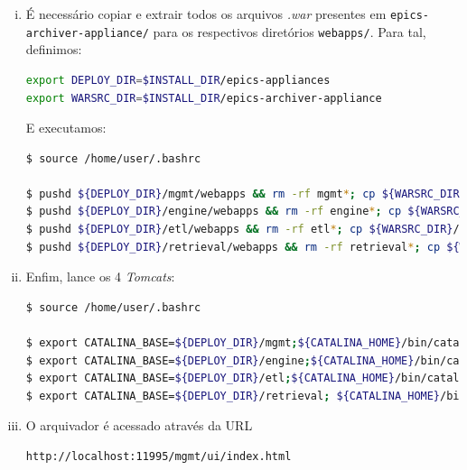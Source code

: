 \begin {enumerate}[i.]
\item É necessário copiar e extrair todos os arquivos \textit{.war} presentes em
\texttt{epics-archiver-appliance/} para os respectivos diretórios
\texttt{webapps/}. Para tal, definimos:

\begin{lstlisting}[language=bash, style=nonumbers]
export DEPLOY_DIR=$INSTALL_DIR/epics-appliances
export WARSRC_DIR=$INSTALL_DIR/epics-archiver-appliance
\end{lstlisting}

E executamos:

\begin{lstlisting}[language=bash, style=nonumbers]
$ source /home/user/.bashrc

$ pushd ${DEPLOY_DIR}/mgmt/webapps && rm -rf mgmt*; cp ${WARSRC_DIR}/mgmt.war .; mkdir mgmt; cd mgmt; jar xf ../mgmt.war; popd; 
$ pushd ${DEPLOY_DIR}/engine/webapps && rm -rf engine*; cp ${WARSRC_DIR}/engine.war .; mkdir engine; cd engine; jar xf ../engine.war; popd; 
$ pushd ${DEPLOY_DIR}/etl/webapps && rm -rf etl*; cp ${WARSRC_DIR}/etl.war .; mkdir etl; cd etl; jar xf ../etl.war; popd; 
$ pushd ${DEPLOY_DIR}/retrieval/webapps && rm -rf retrieval*; cp ${WARSRC_DIR}/retrieval.war .; mkdir retrieval; cd retrieval; jar xf ../retrieval.war; popd;

\end{lstlisting}

\item Enfim, lance os 4 \textit{Tomcats}:

\begin{lstlisting}[language=bash, style=nonumbers]
$ source /home/user/.bashrc

$ export CATALINA_BASE=${DEPLOY_DIR}/mgmt;${CATALINA_HOME}/bin/catalina.sh start 
$ export CATALINA_BASE=${DEPLOY_DIR}/engine;${CATALINA_HOME}/bin/catalina.sh start 
$ export CATALINA_BASE=${DEPLOY_DIR}/etl;${CATALINA_HOME}/bin/catalina.sh start 
$ export CATALINA_BASE=${DEPLOY_DIR}/retrieval; ${CATALINA_HOME}/bin/catalina.sh start

\end{lstlisting}

\item O arquivador é acessado através da URL 

\begin{lstlisting}[language=bash, style=nonumbers]
http://localhost:11995/mgmt/ui/index.html
\end{lstlisting}

\end{enumerate} 


